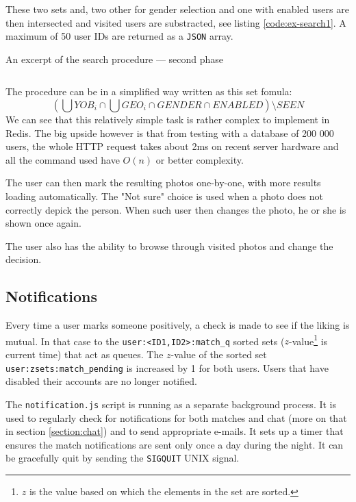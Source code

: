 \documentclass[12pt,oneside]{fithesis}
\begin{document}
		These two sets and, two other for gender selection and one with enabled users are then intersected and visited users are substracted, see listing \ref{code:ex-search1}. A maximum of 50 user IDs are returned as a \texttt{JSON} array.
		
		\begin{program}[h]
		\caption{An excerpt of the search procedure --- second phase}
		\label{code:ex-search1}
		\inputminted[fontsize=\footnotesize, linenos=false]{javascript}{ex-search1.js}
		\end{program}
	
		The procedure can be in a simplified way written as this set fomula:
		\[
			\left( \bigcup YOB_i \cap \bigcup GEO_i \cap GENDER \cap ENABLED \right) \setminus SEEN
		\]
		We can see that this relatively simple task is rather complex to implement in Redis. The big upside however is that from testing with a database of 200 000 users, the whole HTTP request takes about 2ms on recent server hardware and all the command used have $O(n)$ or better complexity.
	
		The user can then mark the resulting photos one-by-one, with more results loading automatically. The "Not sure" choice is used when a photo does not correctly depick the person. When such user then changes the photo, he or she is shown once again. 
		
		The user also has the ability to browse through visited photos and change the decision.
		\clearpage
	\subsection{Notifications}
		Every time a user marks someone positively, a check is made to see if the liking is mutual. In that case to the \texttt{user:<ID1,ID2>:match\_q} sorted sets ($z$-value\footnote{$z$ is the value based on which the elements in the set are sorted.} is current time) that act as queues. The $z$-value of the sorted set \texttt{user:zsets:match\_pending} is increased by 1 for both users. Users that have disabled their accounts are no longer notified.
		
		The \texttt{notification.js} script is running as a separate background process. It is used to regularly check for notifications for both matches and chat (more on that in section \ref{section:chat}) and to send appropriate e-mails. It sets up a timer that ensures the match notifications are sent only once a day during the night. It can be gracefully quit by sending the \texttt{SIGQUIT} UNIX signal.
		
\end{document}
